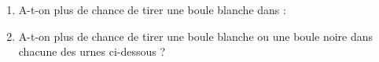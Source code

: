 \begin{pageAuto}
 
\ExoAuto


 \begin{enumerate}
\item A-t-on plus de chance de tirer une boule blanche dans :
\item A-t-on plus de chance de tirer une boule blanche ou une boule noire dans chacune  
des urnes ci-dessous ?
\end{enumerate}



\end{pageAuto}
